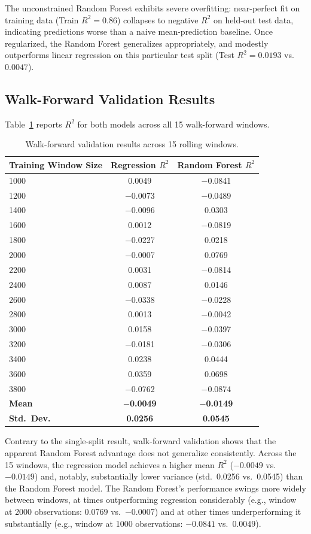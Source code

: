 \documentclass[11pt]{article}
\begin{document}
The unconstrained Random Forest exhibits severe overfitting: near-perfect fit on training data (Train $R^2 = 0.86$) collapses to negative $R^2$ on held-out test data, indicating predictions worse than a naive mean-prediction baseline. Once regularized, the Random Forest generalizes appropriately, and modestly outperforms linear regression on this particular test split (Test $R^2 = 0.0193$ vs.\ $0.0047$).

\subsection{Walk-Forward Validation Results}

Table~\ref{tab:walkforward} reports $R^2$ for both models across all 15 walk-forward windows.

\begin{table}[h]
\centering
\begin{tabular}{lcc}
\toprule
Training Window Size & Regression $R^2$ & Random Forest $R^2$ \\
\midrule
1000 & 0.0049 & $-$0.0841 \\
1200 & $-$0.0073 & $-$0.0489 \\
1400 & $-$0.0096 & 0.0303 \\
1600 & 0.0012 & $-$0.0819 \\
1800 & $-$0.0227 & 0.0218 \\
2000 & $-$0.0007 & 0.0769 \\
2200 & 0.0031 & $-$0.0814 \\
2400 & 0.0087 & 0.0146 \\
2600 & $-$0.0338 & $-$0.0228 \\
2800 & 0.0013 & $-$0.0042 \\
3000 & 0.0158 & $-$0.0397 \\
3200 & $-$0.0181 & $-$0.0306 \\
3400 & 0.0238 & 0.0444 \\
3600 & 0.0359 & 0.0698 \\
3800 & $-$0.0762 & $-$0.0874 \\
\midrule
\textbf{Mean} & \textbf{$-$0.0049} & \textbf{$-$0.0149} \\
\textbf{Std.\ Dev.} & \textbf{0.0256} & \textbf{0.0545} \\
\bottomrule
\end{tabular}
\caption{Walk-forward validation results across 15 rolling windows.}
\label{tab:walkforward}
\end{table}

Contrary to the single-split result, walk-forward validation shows that the apparent Random Forest advantage does not generalize consistently. Across the 15 windows, the regression model achieves a higher mean $R^2$ ($-0.0049$ vs.\ $-0.0149$) and, notably, substantially lower variance (std.\ 0.0256 vs.\ 0.0545) than the Random Forest model. The Random Forest's performance swings more widely between windows, at times outperforming regression considerably (e.g., window at 2000 observations: $0.0769$ vs.\ $-0.0007$) and at other times underperforming it substantially (e.g., window at 1000 observations: $-0.0841$ vs.\ $0.0049$).
\end{document}
